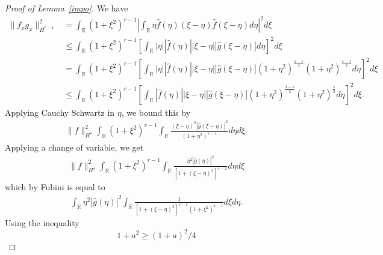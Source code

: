\documentclass[12pt,reqno]{amsart}
\numberwithin{equation}{section}  %
\numberwithin{figure}{section}
\newcommand{\rr}{\mathbb{R}}
\newcommand{\wh}{\widehat}
\begin{document}
%
\begin{proof}[Proof of Lemma~\ref{impo}]
We have
%
%
\begin{equation*}
\begin{split}
  \| f_{x} g_{x} \|_{H^{r-1}}^{2}
  & = \int_{\rr} (1 + \xi^{2})^{r-1}| \int_{\rr} 
  \eta \wh{f}(\eta) (\xi - \eta) \wh{f}(\xi - \eta) d \eta |^{2} d \xi
  \\
  & \le \int_{\rr} (1 + \xi^{2})^{r-1}\left [ \int_{\rr} |
  \eta| | \wh{f}(\eta) | | \xi - \eta |  | \wh{g}(\xi - \eta) | 
  d \eta \right ]^{2} d \xi
  \\
  & = \int_{\rr}  (1 + \xi^{2})^{r-1}\left [ \int_{\rr} |
  \eta| | \wh{f}(\eta) | | \xi - \eta |  | \wh{g}(\xi - \eta) | (1 +
  \eta^{2})^{\frac{1-s}{2}} (1 + \eta^{2})^{\frac{s-1}{2}}
  d \eta \right ]^{2} d \xi
  \\
  & \le \int_{\rr}  (1 + \xi^{2})^{r-1}\left [ \int_{\rr}
  | \wh{f}(\eta) | |
  \xi -\eta|  | \wh{g}(\xi - \eta) | (1 +
  \eta^{2})^{\frac{1-s}{2}} (1 + \eta^{2})^{\frac{s}{2}}
  d \eta \right ]^{2} d \xi.
\end{split}
\end{equation*}
%
Applying Cauchy Schwartz in $\eta$, we bound this by
%
%
%
\begin{equation}
  \label{np-key-term-d}
\begin{split}
  \| f \|_{H^{s}}^{2} \int_{\rr}  (1 + \xi^{2})^{r-1}\int_{\rr} \frac{(\xi -
  \eta)^{2} | \wh{g}(\xi - \eta) |^{2}}{(1 + \eta^{2})^{s-1}} d \eta d \xi.
  \end{split}
\end{equation}
%
%
Applying a change of variable, we get
%
\begin{equation*}
\begin{split}
  \| f \|_{H^{s}}^{2} \int_{\rr} (1 + \xi^{2})^{r-1} \int_{\rr} \frac{\eta^{2}
  | \wh{g}(\eta) |^{2}}{[1 + (\xi - \eta)^{2}]^{s-1}} d \eta d \xi
  \end{split}
\end{equation*}
which by Fubini is equal to
%
%
\begin{equation*}
\begin{split}
  \int_{\rr} \eta^{2} | \wh{g}(\eta) |^{2} \int_{\rr} \frac{1}{\left[ 1 + (\xi -
  \eta)^{2} \right]^{s-1} (1 + \xi^{2})^{1-r}} d \xi d \eta.
\end{split}
\end{equation*}
%
Using the inequality 
\begin{equation}
  \label{simp-ineq}
  1 + a^{2} \ge (1 + a)^{2}/4
\end{equation}

\end{proof}
\end{document}
